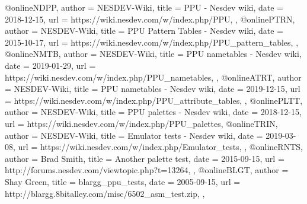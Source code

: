 @online{NDPP,
	author = {NESDEV-Wiki},
	title = {PPU - Nesdev wiki},
	date = {2018-12-15},
	url = {https://wiki.nesdev.com/w/index.php/PPU},
},
@online{PTRN,
	author = {NESDEV-Wiki},
	title = {PPU Pattern Tables - Nesdev wiki},
	date = {2015-10-17},
	url = {https://wiki.nesdev.com/w/index.php/PPU_pattern_tables},
},
@online{NMTB,
	author = {NESDEV-Wiki},
	title = {PPU nametables - Nesdev wiki},
	date = {2019-01-29},
	url = {https://wiki.nesdev.com/w/index.php/PPU_nametables},
},
@online{ATRT,
	author = {NESDEV-Wiki},
	title = {PPU nametables - Nesdev wiki},
	date = {2019-12-15},
	url = {https://wiki.nesdev.com/w/index.php/PPU_attribute_tables},
},
@online{PLTT,
	author = {NESDEV-Wiki},
	title = {PPU palettes - Nesdev wiki},
	date = {2018-12-15},
	url = {https://wiki.nesdev.com/w/index.php/PPU_palettes},
}
@online{TRIN,
	author = {NESDEV-Wiki},
	title = {Emulator tests - Nesdev wiki},
	date = {2019-03-08},
	url = {https://wiki.nesdev.com/w/index.php/Emulator_tests},
},
@online{RNTS,
	author = {Brad Smith},
	title = {Another palette test},
	date = {2015-09-15},
	url = {http://forums.nesdev.com/viewtopic.php?t=13264},
},
@online{BLGT,
	author = {Shay Green},
	title = {blargg\_ppu\_tests},
	date = {2005-09-15},
	url = {http://blargg.8bitalley.com/misc/6502_asm_test.zip},
},